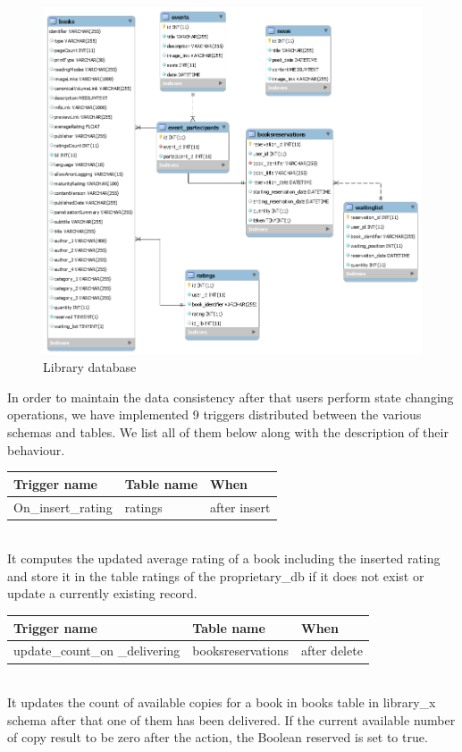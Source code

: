 \vspace*{0cm}
\begin{figure}[H]
	\centering
	\includegraphics[scale=0.50]{Images/Diagrams/library_db_UML}
	\caption{Library database}
\end{figure}

In order to maintain the data consistency after that users perform state changing operations, we have implemented 9 triggers distributed between the various schemas and tables. We list all of them below along with the description of their behaviour.


\begin{tabular}[H]{p{4cm}|p{4cm}|p{4cm}}
	\textbf{Trigger name} & \textbf{Table name} & \textbf{When} \\
	\hline
	\rule{0pt}{4ex} On\_insert\_rating  & ratings & after insert \\
	\hline
\end{tabular}
\vspace{0.8cm}
\\
It computes the updated average rating of a book including the inserted rating and store it in the table ratings of the proprietary\_db if it does not exist or update a currently existing record.

\vspace{0.8cm}
\begin{tabular}[H]{p{4cm}|p{4cm}|p{4cm}}
	\textbf{Trigger name} & \textbf{Table name} & \textbf{When} \\
	\hline
	\rule{0pt}{4ex} update\_count\_on
	\_delivering  & booksreservations & after delete \\
	\hline
\end{tabular}
 \vspace{0.8cm}\\
It updates the count of available copies for a book in books table in library\_x schema after that one of them has been delivered. If the current available number of copy result to be zero after the action, the Boolean reserved is set to true.


